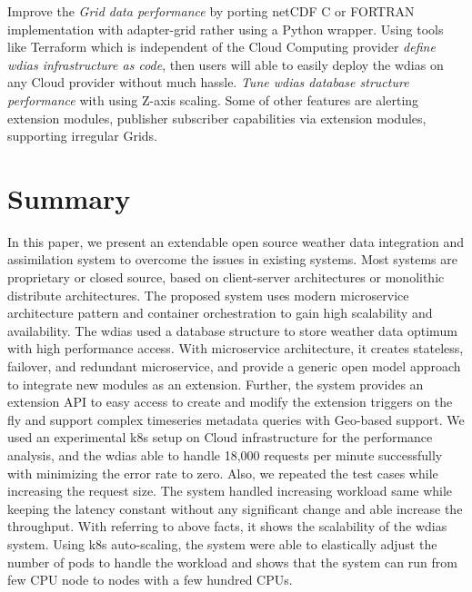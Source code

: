 \documentclass[conference]{IEEEtran}
\begin{document}
Improve the \emph{Grid data performance} by porting \acrshort{netCDF} C or FORTRAN implementation with adapter-grid rather using a Python wrapper. Using tools like Terraform which is independent of the Cloud Computing provider \emph{define \acrshort{wdias} infrastructure as code}, then users will able to easily deploy the \acrshort{wdias} on any Cloud provider without much hassle. \emph{Tune \acrshort{wdias} database structure performance} with using Z-axis scaling. Some of other features are alerting extension modules, publisher subscriber capabilities via extension modules, supporting irregular Grids.

\section{Summary}
\label{pse:summary}

In this paper, we present an extendable open source weather data integration and assimilation system to overcome the issues in existing systems. Most systems are proprietary or closed source, based on client-server architectures or monolithic distribute architectures. The proposed system uses modern microservice architecture pattern and container orchestration to gain high scalability and availability. The \acrshort{wdias} used a database structure to store weather data optimum with high performance access. With microservice architecture, it creates stateless, failover, and redundant microservice, and provide a generic open model approach to integrate new modules as an extension. Further, the system provides an extension API to easy access to create and modify the extension triggers on the fly and support complex timeseries metadata queries with Geo-based support.
We used an experimental \acrshort{k8s} setup on Cloud infrastructure for the performance analysis, and the \acrshort{wdias} able to handle 18,000 requests per minute successfully with minimizing the error rate to zero. Also, we repeated the test cases while increasing the request size. The system handled increasing workload same while keeping the latency constant without any significant change and able increase the throughput. With referring to above facts, it shows the scalability of the \acrshort{wdias} system.
Using \acrshort{k8s} auto-scaling, the system were able to elastically adjust the number of pods to handle the workload and shows that the system can run from few CPU node to nodes with a few hundred CPUs.
\end{document}
